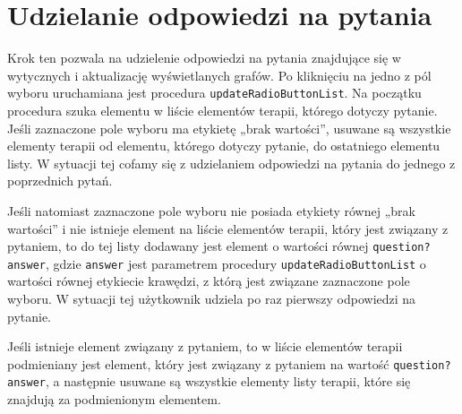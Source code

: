 \section{Udzielanie odpowiedzi na pytania}
Krok ten pozwala na udzielenie odpowiedzi na pytania znajdujące się w wytycznych i aktualizację wyświetlanych grafów.
Po kliknięciu na jedno z pól wyboru uruchamiana jest procedura \texttt{updateRadioButtonList}. Na początku procedura szuka elementu w liście elementów terapii, którego dotyczy pytanie. Jeśli zaznaczone pole wyboru ma etykietę „brak wartości”, usuwane są wszystkie elementy terapii od elementu, którego dotyczy pytanie, do ostatniego elementu listy. W sytuacji tej cofamy się z udzielaniem odpowiedzi na pytania do jednego z poprzednich pytań.

Jeśli natomiast zaznaczone pole wyboru nie posiada etykiety równej „brak wartości” i nie istnieje element na liście elementów terapii, który jest związany z pytaniem, to do tej listy dodawany jest element o wartości równej \texttt{question?answer}, gdzie \texttt{answer} jest parametrem procedury \texttt{updateRadioButtonList} o wartości równej etykiecie krawędzi, z którą jest związane zaznaczone pole wyboru. W sytuacji tej użytkownik udziela po raz pierwszy odpowiedzi na pytanie. 

Jeśli istnieje element związany z pytaniem, to w liście elementów terapii podmieniany jest element, który jest związany z pytaniem na wartość \texttt{question?answer}, a następnie usuwane są wszystkie elementy listy terapii, które się znajdują za podmienionym elementem. 

